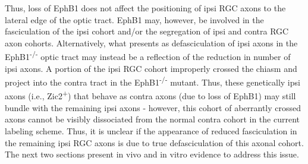 Thus, loss of EphB1 does not affect the positioning of ipsi RGC axons to the lateral edge of the optic tract.
EphB1 may, however, be involved in the fasciculation of the ipsi cohort and/or the segregation of ipsi and contra RGC axon cohorts.
Alternatively, what presents as defasciculation of ipsi axons in the EphB1\textsuperscript{-/-} optic tract may instead be a reflection of the reduction in number of ipsi axons.
A portion of the ipsi RGC cohort improperly crossed the chiasm and project into the contra tract in the EphB1\textsuperscript{-/-} mutant.
Thus, these genetically ipsi axons (i.e., Zic2\textsuperscript{+}) that behave as contra axons (due to loss of EphB1) may still bundle with the remaining ipsi axons - however, this cohort of aberrantly crossed axons cannot be visibly dissociated from the normal contra cohort in the current labeling scheme.
Thus, it is unclear if the appearance of reduced fasciculation in the remaining ipsi RGC axons is due to true defasciculation of this axonal cohort.
The next two sections present in vivo and in vitro evidence to address this issue.
